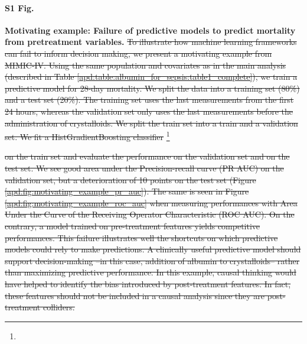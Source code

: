 \documentclass[10pt,letterpaper]{article}
\providecommand{\DIFdeltex}[1]{{\protect\color{red}\sout{#1}}}                      %
\providecommand{\DIFdelbegin}{} %
\providecommand{\DIFdel}[1]{\texorpdfstring{\DIFdeltex{#1}}{}} %
\newcommand{\DIFscaledelfig}{0.5}
\newlength{\DIFdelgraphicswidth} %
\newlength{\DIFdelgraphicsheight} %
\newcommand{\DIFdelincludegraphics}[2][]{%
\sbox{\DIFdelgraphicsbox}{\DIFOincludegraphics[#1]{#2}}%
\settoboxwidth{\DIFdelgraphicswidth}{\DIFdelgraphicsbox} %
\settoboxtotalheight{\DIFdelgraphicsheight}{\DIFdelgraphicsbox} %
\scalebox{\DIFscaledelfig}{%
\parbox[b]{\DIFdelgraphicswidth}{\usebox{\DIFdelgraphicsbox}\\[-\baselineskip] \rule{\DIFdelgraphicswidth}{0em}}\llap{\resizebox{\DIFdelgraphicswidth}{\DIFdelgraphicsheight}{%
\setlength{\unitlength}{\DIFdelgraphicswidth}%
\begin{picture}(1,1)%
\thicklines\linethickness{2pt} %
{\color[rgb]{1,0,0}\put(0,0){\framebox(1,1){}}}%
{\color[rgb]{1,0,0}\put(0,0){\line( 1,1){1}}}%
{\color[rgb]{1,0,0}\put(0,1){\line(1,-1){1}}}%
\end{picture}%
}\hspace*{3pt}}} %
} %
\DeclareRobustCommand{\DIFdelbegin}{\DIFOdelbegin \let\includegraphics\DIFdelincludegraphics} %
\begin{document}
\paragraph*{S1 Fig.}
\label{apd:motivating_example}
{\bf Motivating example: Failure of predictive models to predict mortality
  from pretreatment variables.}
\DIFdelbegin \DIFdel{To illustrate how machine learning frameworks can fail to inform decision
  making, we present a motivating example from MIMIC-IV. Using the same
  population and covariates as in the main analysis (described in Table
  \ref{apd:table:albumin_for_sepsis:table1_complete}), we train a predictive
  model for 28-day mortality. We split the data into a training set (80\%) and a
  test set (20\%). The training set uses the last measurements from the first 24
  hours, whereas the validation set only uses the last measurements before the
  administration of crystalloids. We split the train set into a train and a
  validation set. We fit a HistGradientBoosting classifier
}\footnote{%
}
\addtocounter{footnote}{-1}%
\DIFdel{on the train set and evaluate the performance on the validation set and on the
  test set. We see good area under the Precision-recall curve (PR AUC) on the
  validation set, but a deterioration of 10 points on the test set (Figure
  \ref{apd:fig:motivating_example_pr_auc}). The same is seen in Figure
  \ref{apd:fig:motivating_example_roc_auc} when measuring performances with Area
  Under the Curve of the Receiving Operator Characteristic (ROC AUC). On the
  contrary, a model trained on pre-treatment features yields competitive
  performances. This failure illustrates well the shortcuts on which predictive
  models could rely to make predictions. A clinically useful predictive model
  should support decision-making --in this case, addition of albumin to
  crystalloids-- rather than maximizing predictive performance. In this example,
  causal thinking would have helped to identify the bias introduced by
  post-treatment features. In fact, these features should not be included in a
  causal analysis since they are post-treatment colliders.
}%
\end{document}
